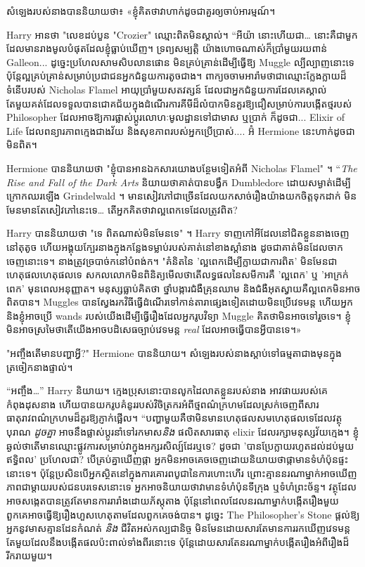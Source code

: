 {{{{សំឡេង​របស់​នាង​បាន​និយាយ​ថា​៖ «​ខ្ញុំ​គិត​ថា​វា​ហាក់​ដូច​ជា​គួរ​ឲ្យ​ចាប់​អារម្មណ៍។

Harry អានថា "លេខដប់បួន "Crozier" ឈ្មោះពិតមិនស្គាល់។ “អីយ៉ា នោះហើយជា… នោះគឺជាមួកដែលមានរាងមូលបំផុតដែលខ្ញុំធ្លាប់ឃើញ។ ទ្រព្យសម្បត្តិ យ៉ាងហោចណាស់ក៏ប្រាំមួយរយពាន់ Galleon... ដូច្នេះប្រហែលសាមសិបលានផោន មិនគ្រប់គ្រាន់ដើម្បីធ្វើឱ្យ Muggle ល្បីល្បាញនោះទេ ប៉ុន្តែល្អគ្រប់គ្រាន់សម្រាប់ប្រជាជនអ្នកជំនួយការតូចជាង។ ពាក្យចចាមអារ៉ាមថាជាឈ្មោះក្លែងក្លាយដ៏ទំនើបរបស់ Nicholas Flamel អាយុប្រាំមួយសតវត្សន៍ ដែលជាអ្នកជំនួយការដែលគេស្គាល់តែមួយគត់ដែលទទួលបានជោគជ័យក្នុងដំណើរការគីមីដ៏លំបាកមិនគួរឱ្យជឿសម្រាប់ការបង្កើតថ្មរបស់ Philosopher ដែលអាចឱ្យការផ្លាស់ប្តូរលោហៈមូលដ្ឋានទៅជាមាស ឬប្រាក់ ក៏ដូចជា... Elixir of Life ដែលពន្យារភាពក្មេងជាងវ័យ និងសុខភាពរបស់អ្នកប្រើប្រាស់.... អ៊ំ Hermione នេះហាក់ដូចជាមិនពិត។

Hermione បាននិយាយថា "ខ្ញុំបានអានឯកសារយោងបន្ថែមទៀតអំពី Nicholas Flamel" ។ “\emph{The Rise and Fall of the Dark Arts} និយាយថាគាត់បានបង្វឹក Dumbledore ដោយសម្ងាត់ដើម្បីក្រោកឈរឡើង Grindelwald ។ មាន​សៀវភៅ​ជា​ច្រើន​ដែល​យក​សាច់​រឿង​យ៉ាង​យក​ចិត្ត​ទុក​ដាក់ មិន​មែន​មាន​តែ​សៀវភៅ​នេះ​ទេ… តើ​អ្នក​គិត​ថា​វា​ល្អ​ពេក​ទេ​ដែល​ត្រូវ​ពិត?

Harry បាននិយាយថា "ទេ ពិតណាស់មិនមែនទេ" ។ Harry ទាញ​កៅអី​ដែល​នៅ​ជិត​ខ្លួន​នាង​ចេញ​នៅ​តុ​តូច ហើយ​អង្គុយ​ក្បែរ​នាង​ក្នុង​កន្លែង​ទម្លាប់​របស់​គាត់​នៅ​ខាង​ស្ដាំ​នាង ដូច​ជា​គាត់​មិន​ដែល​ចាកចេញ​នោះ​ទេ។ នាង​ត្រូវ​ច្របាច់​ក​នៅ​បំពង់ក។ "គំនិតនៃ 'ល្អពេកដើម្បីក្លាយជាការពិត' មិនមែនជាហេតុផលហេតុផលទេ សកលលោកមិនពិនិត្យមើលថាតើលទ្ធផលនៃសមីការគឺ 'ល្អពេក' ឬ 'អាក្រក់ពេក' មុនពេលអនុញ្ញាត។ មនុស្ស​ធ្លាប់​គិត​ថា ថ្នាំ​បង្ការ​ជំងឺ​គ្រុនឈាម និង​ជំងឺ​អុតស្វាយ​គឺ​ល្អ​ពេក​មិន​អាច​ពិត​បាន។ Muggles បានស្វែងរកវិធីធ្វើដំណើរទៅកាន់តារាផ្សេងទៀតដោយមិនប្រើវេទមន្ត ហើយអ្នក និងខ្ញុំអាចប្រើ wands របស់យើងដើម្បីធ្វើរឿងដែលអ្នករូបវិទ្យា Muggle គិតថាមិនអាចទៅរួចទេ។ ខ្ញុំ​មិន​អាច​ស្រមៃ​ថា​តើ​យើង​អាច​បដិសេធ​ច្បាប់​វេទមន្ត \emph{real} ដែល​អាច​ធ្វើ​បាន​អ្វី​បាន​ទេ។»

"អញ្ចឹងតើមានបញ្ហាអ្វី?" Hermione បាននិយាយ។ សំឡេង​របស់​នាង​ស្តាប់​ទៅ​ធម្មតា​ជាង​មុន​ក្នុង​ត្រចៀក​នាង​ផ្ទាល់។

“អញ្ចឹង…” Harry និយាយ។ ក្មេងប្រុសនោះបានលូកដៃលាតខ្លួនរបស់នាង អាវផាយរបស់គេកំពុងដុសនាង ហើយបានយករូបគំនូររបស់វិចិត្រករអំពីថ្មពណ៌ក្រហមដែលស្រក់ចេញពីសារធាតុរាវពណ៌ក្រហមដ៏គួរឱ្យភ្ញាក់ផ្អើល។ “បញ្ហាមួយគឺថាមិនមានហេតុផលសមហេតុផលទេដែលវត្ថុបុរាណ \emph{ដូចគ្នា} អាចនឹងផ្លាស់ប្តូរនាំទៅរកមាស\emph{និង} ផលិតសារធាតុ elixir ដែលរក្សាមនុស្សវ័យក្មេង។ ខ្ញុំ​ឆ្ងល់​ថា​តើ​មាន​ឈ្មោះ​ផ្លូវការ​សម្រាប់​វា​ក្នុង​អក្សរសិល្ប៍​ដែរ​ឬ​ទេ? ដូចជា 'បានប្រែក្លាយរហូតដល់ដប់មួយឥទ្ធិពល' ប្រហែលជា? បើគ្រប់គ្នាឃើញផ្កា អ្នកមិនអាចគេចចេញដោយនិយាយថាផ្កាមានទំហំប៉ុនផ្ទះនោះទេ។ ប៉ុន្តែប្រសិនបើអ្នកស្ថិតនៅក្នុងការគោរពបូជានៃការហោះហើរ ព្រោះគ្មាននរណាម្នាក់អាចឃើញភាពជាម្តាយរបស់ជនបរទេសនោះទេ អ្នកអាចនិយាយថាវាមានទំហំប៉ុនទីក្រុង ឬទំហំព្រះច័ន្ទ។ វត្ថុដែលអាចសង្កេតបានត្រូវតែមានការរារាំងដោយភ័ស្តុតាង ប៉ុន្តែនៅពេលដែលនរណាម្នាក់បង្កើតរឿងមួយ ពួកគេអាចធ្វើឱ្យរឿងហួសហេតុតាមដែលពួកគេចង់បាន។ ដូច្នេះ The Philosopher's Stone ផ្តល់ឱ្យអ្នកនូវមាសគ្មានដែនកំណត់ \emph{និង} ជីវិតអស់កល្បជានិច្ច មិនមែនដោយសារតែមានការរកឃើញវេទមន្តតែមួយដែលនឹងបង្កើតផលប៉ះពាល់ទាំងពីរនោះទេ ប៉ុន្តែដោយសារតែនរណាម្នាក់បង្កើតរឿងអំពីរឿងដ៏រីករាយមួយ។

}}}}
